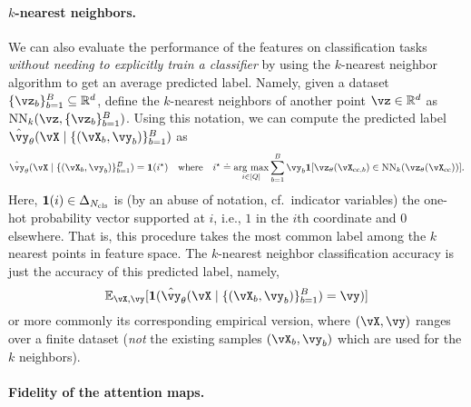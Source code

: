 \documentclass[../../book-main.tex]{subfiles}
\begin{document}
\paragraph{\(k\)-nearest neighbors.}  We can also evaluate the performance of the features on classification tasks \textit{without needing to explicitly train a classifier} by using the \(k\)-nearest neighbor algorithm to get an average predicted label. Namely, given a dataset \(\{\vz_{b}\}_{b = 1}^{B} \subseteq \R^{d}\), define the \(k\)-nearest neighbors of another point \(\vz \in \R^{d}\) as \(\operatorname{NN}_{k}(\vz, \{\vz_{b}\}_{b = 1}^{B})\). Using this notation, we can compute the predicted label \(\hat{\vy}_{\theta}(\vX \mid \{(\vX_{b}, \vy_{b})\}_{b = 1}^{B})\) as 
\begin{equation}
    \hat{\vy}_{\theta}(\vX \mid \{(\vX_{b}, \vy_{b})\}_{b = 1}^{B}) = \vone(i^{\star}) \quad \text{where} \quad i^{\star} \doteq \argmax_{i \in [Q]}\sum_{b = 1}^{B}\vy_{b}\indvar[\vz_{\theta}(\vX_{\cc, b}) \in \operatorname{NN}_{k}(\vz_{\theta}(\vX_{\cc}))].
\end{equation}
Here, \(\bm{1}(i) \in \Delta_{N_{\mathrm{cls}}}\) is (by an abuse of notation, cf.~indicator variables) the one-hot probability vector supported at \(i\), i.e., \(1\) in the \(i\)th coordinate and \(0\) elsewhere. That is, this procedure takes the most common label among the \(k\) nearest points in feature space. The \(k\)-nearest neighbor classification accuracy is just the accuracy of this predicted label, namely,
\begin{equation}
    \Ex_{\vX, \vy}[\indvar(\hat{\vy}_{\theta}(\vX \mid \{(\vX_{b}, \vy_{b})\}_{b = 1}^{B}) = \vy)]
\end{equation}
or more commonly its corresponding empirical version, where \((\vX, \vy)\) ranges over a finite dataset (\textit{not} the existing samples \((\vX_{b}, \vy_{b})\) which are used for the \(k\) neighbors).

\paragraph{Fidelity of the attention maps.}
\end{document}
